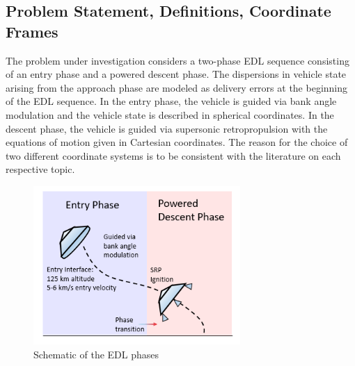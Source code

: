 \documentclass[letterpaper, preprint, paper,11pt]{AAS}
\begin{document}

\subsection{Problem Statement, Definitions, Coordinate Frames}
The problem under investigation considers a two-phase EDL sequence consisting of an entry phase and a powered descent phase. The dispersions in vehicle state arising from the approach phase are modeled as delivery errors at the beginning of the EDL sequence. In the entry phase, the vehicle is guided via bank angle modulation and the vehicle state is described in spherical coordinates. In the descent phase, the vehicle is guided via supersonic retropropulsion with the equations of motion given in Cartesian coordinates.  The reason for the choice of two different coordinate systems is to be consistent with the literature on each respective topic.

\begin{figure}[h!]
	\centering
	\includegraphics[width=0.7\textwidth]{EDLPhaseDiagram} 
	\caption{Schematic of the EDL phases}
	\label{fig_phases}
\end{figure}
\end{document}
